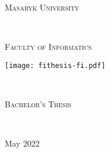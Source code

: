 \begin{titlepage}
  \vspace*{2cm}
  \makeatletter
  \begin{center}
      \begin{LARGE}
          \textsc{Masaryk University}
      \end{LARGE}\\[0.01cm]
      \begin{Large}
          \textsc{Faculty of Informatics\\}
      \end{Large}
      \vspace*{1cm}
      \texttt{[image: fithesis-fi.pdf]}\\
      \vspace*{3cm}
    \begin{Huge}
      \@title
    \end{Huge}\\[1.5cm]
    \begin{Large}
        \textsc{Bachelor's Thesis}
    \end{Large}\\[1.5cm]
    \begin{LARGE}
        \@author
    \end{LARGE}
    \vfill
  \end{center}
  \begin{flushright}
      \begin{large}
        May 2022
      \end{large}
  \end{flushright}
  \makeatother
\end{titlepage}

\newpage
\null
\thispagestyle{empty}
\newpage

